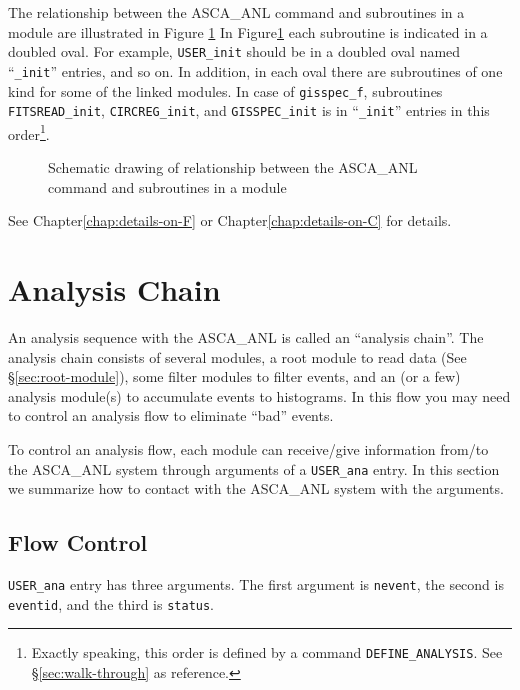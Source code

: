 The relationship between the ASCA\_ANL command and subroutines in a module
are illustrated in Figure \ref{fig:call_module}
In Figure\ref{fig:call_module}
each subroutine is indicated in a doubled oval.
For example,
{\tt USER\_init} should be in a doubled oval named ``{\tt \_init}'' entries,
and so on.
In addition,
in each oval there are subroutines of one kind for some of the linked modules.
In case of {\tt gisspec\_f},
subroutines {\tt FITSREAD\_init}, {\tt CIRCREG\_init}, and {\tt GISSPEC\_init}
is in ``{\tt \_init}'' entries in this order\footnote{
Exactly speaking,
this order is defined by a command {\tt DEFINE\_ANALYSIS}.
See \S \ref{sec:walk-through} as reference.
}.

\begin{figure}[p]
\begin{center}
\caption{Schematic drawing of relationship
between the ASCA\_ANL command and subroutines in a module}
\label{fig:call_module}
\end{center}
\end{figure}

See Chapter\ref{chap:details-on-F} or Chapter\ref{chap:details-on-C}
for details.

\section{Analysis Chain}
An analysis sequence with the ASCA\_ANL is called an ``analysis chain''.
The analysis chain consists of several modules,
a root module to read data (See \S \ref{sec:root-module}),
some filter modules to filter events,
and an (or a few) analysis module(s) to accumulate events to histograms.
In this flow
you may need to control an analysis flow to eliminate ``bad'' events.

To control an analysis flow,
each module can receive/give information from/to the ASCA\_ANL system
through arguments of a {\tt USER\_ana} entry.
In this section
we summarize how to contact with the ASCA\_ANL system with the arguments.

\subsection{Flow Control}\label{sec:flow-control}
{\tt USER\_ana} entry has three arguments.
The first argument is {\tt nevent},
the second is {\tt eventid},
and the third is {\tt status}.

